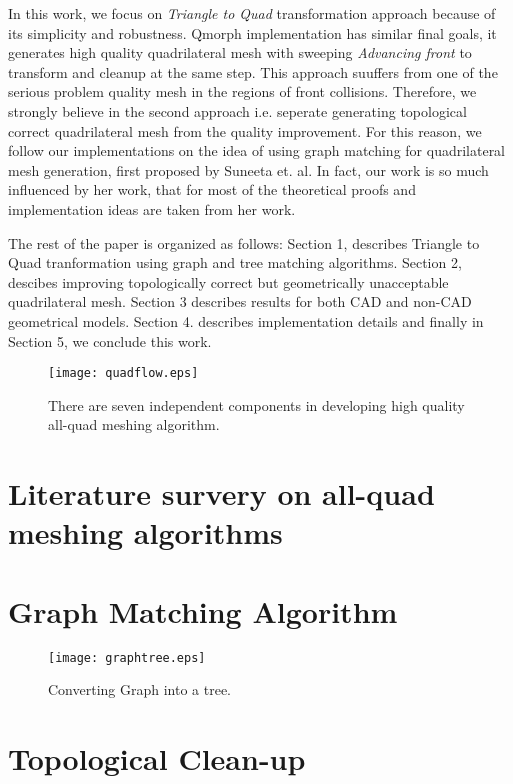\documentclass[11pt, a4paper]{paper}
\begin{document}
In this work, we focus on {\em Triangle to Quad} transformation approach because of its simplicity and
robustness. Qmorph implementation has similar final goals, it generates high quality quadrilateral mesh
with sweeping {\em Advancing front } to transform and cleanup at the same step. This approach suuffers
from one of the serious problem quality mesh in the regions of front collisions. Therefore, we strongly
believe in the second approach i.e. seperate generating topological correct quadrilateral mesh from the
quality improvement. For this reason, we follow our implementations on the idea of using graph matching
for quadrilateral mesh generation, first proposed by Suneeta et. al. In fact, our work is so much influenced
by her work, that for most of the theoretical proofs and implementation ideas are taken from her work.  

The rest of the paper is organized as follows: Section 1, describes Triangle to Quad tranformation using graph and tree matching algorithms. Section 2, descibes improving topologically correct but geometrically unacceptable quadrilateral mesh. Section 3 describes results for both CAD and non-CAD geometrical models.
Section 4. describes implementation details and finally in Section 5, we conclude this work.
 \begin{figure}
 \begin{center}
 \texttt{[image: quadflow.eps]}
 \caption{There are seven independent components in developing high quality all-quad meshing algorithm.}
 \end{center}
 \label{fig:flowchart}
\end{figure} 
\section {Literature survery on all-quad meshing algorithms}
\section { Graph Matching Algorithm }
\begin{figure}
 \begin{center}
 \texttt{[image: graphtree.eps]}
 \caption{Converting Graph into a tree.}
 \end{center}
 \label{fig:graph_tree}
\end{figure} 
\section { Topological Clean-up}
\end{document}
